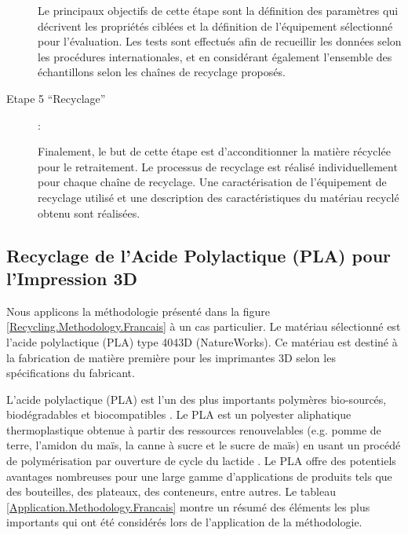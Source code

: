 \begin{description}
	Le principaux objectifs de cette étape sont la définition des paramètres qui décrivent les propriétés ciblées et la définition de l'équipement sélectionné pour l'évaluation.
	Les tests sont effectués afin de recueillir les données selon les procédures internationales, et en considérant également l'ensemble des échantillons selon les chaînes de recyclage proposés.
	
	
	\item[ \hypertarget{Step5}{Etape 5 ``Recyclage''}]:
	
	Finalement, le but de cette étape est d'acconditionner la matière récyclée pour le retraitement.
	Le processus de recyclage est réalisé individuellement pour chaque chaîne de recyclage.
	Une caractérisation de l'équipement de recyclage utilisé et une description des caractéristiques du matériau recyclé obtenu sont réalisées.
	
\end{description}


\subsection*{Recyclage de l'Acide Polylactique (PLA) pour l'Impression 3D}

Nous applicons la méthodologie présenté dans la figure \ref{Recycling.Methodology.Francais} à un cas particulier.
Le matériau sélectionné est l'acide polylactique (PLA)  type 4043D (NatureWorks).  
Ce matériau est destiné à la fabrication de matière première pour les imprimantes 3D selon les spécifications du fabricant.

L'acide polylactique (PLA) est l'un des plus importants polymères bio-sourcés, biodégradables et biocompatibles \parencite{Drumright2000,Mohanty2000,Henton2005,Luckachan2011, Soroudi2013}. 
Le PLA est un polyester aliphatique  thermoplastique obtenue à partir des ressources renouvelables (e.g. pomme de terre, l'amidon du maïs, la canne à sucre et le sucre de maïs)  en usant un procédé de polymérisation par ouverture de cycle du lactide \parencite{Agrawal2003,Hamad2013, Castro-Aguirre2016}.
Le PLA offre des potentiels avantages nombreuses pour une large gamme d'applications de produits tels que des bouteilles, des plateaux, des conteneurs, entre autres.
Le tableau \ref{Application.Methodology.Francais} montre un résumé des éléments les plus importants qui ont été considérés lors de l'application de la méthodologie.


